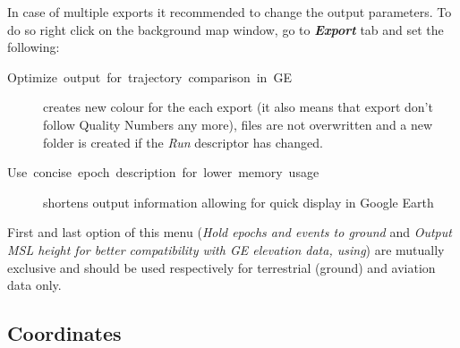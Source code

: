 \documentclass[british,DIV=calc, paper=a4, fontsize=12pt, onecolumn]{scrartcl}
\begin{document}
In case of multiple exports it recommended to change the output parameters. To do so right click on the background map window, go to \textbf{\emph{Export}} tab and set the following:
\begin{description}
	\item [{Optimize~output~for~trajectory~comparison~in~GE}] creates new colour for the each export (it also means that export don\textquoteright{}t follow Quality Numbers any more), files are not overwritten and a new folder is created if the \emph{Run} descriptor has changed.
	\item [{Use~concise~epoch~description~for~lower~memory~usage}] shortens output information allowing for quick display in Google Earth
\end{description}

First and last option of this menu (\emph{Hold epochs and events to ground }and \emph{Output MSL height for better compatibility with GE elevation data, using}) are mutually exclusive and should be used respectively for terrestrial (ground) and aviation data only.

\subsection{Coordinates}


\end{document}
